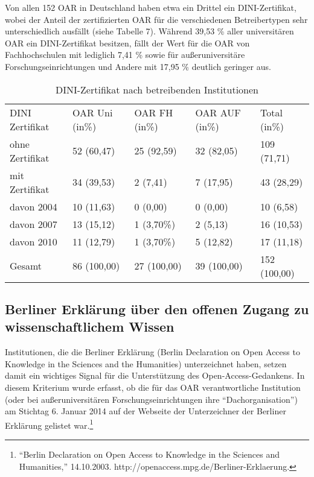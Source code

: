 \documentclass[a4paper,
fontsize=11pt,
oneside,
numbers=noperiodatend,
parskip=half-,
bibliography=totoc,
final
]{scrartcl}
\begin{document}
Von allen 152 OAR in Deutschland haben etwa ein Drittel ein
DINI-Zertifikat, wobei der Anteil der zertifizierten OAR für die
verschiedenen Betreibertypen sehr unterschiedlich ausfällt (siehe
Tabelle 7). Während 39,53 \% aller universitären OAR ein DINI-Zertifikat
besitzen, fällt der Wert für die OAR von Fachhochschulen mit lediglich
7,41 \% sowie für außeruniversitäre Forschungseinrichtungen und Andere
mit 17,95 \% deutlich geringer aus.

\begin{table}[ht]
\centering
\begin{tabular}{lllll}
  \toprule
DINI Zertifikat & OAR Uni (in\%)   & OAR FH (in\%)  & OAR AUF (in\%)  & Total (in\%) \\  
\cmidrule(r){1-1} \cmidrule(r){2-2} \cmidrule(r){3-3} \cmidrule(r){4-4} \cmidrule(r){5-5}
ohne Zertifikat & 52 (60,47) & 25 (92,59) & 32 (82,05) & 109 (71,71)  \\ 
  mit Zertifikat & 34 (39,53) & 2 (7,41) & 7 (17,95) & 43 (28,29) \\ 
  davon 2004 & 10 (11,63) & 0 (0,00) & 0 (0,00) & 10 (6,58) \\ 
  davon 2007 & 13 (15,12) & 1 (3,70\%) & 2 (5,13) & 16 (10,53) \\ 
  davon 2010 & 11 (12,79) & 1 (3,70\%) & 5 (12,82) & 17 (11,18) \\ 
  \cmidrule(r){1-1} \cmidrule(r){2-2} \cmidrule(r){3-3} \cmidrule(r){4-4} \cmidrule(r){5-5}
  Gesamt & 86 (100,00) & 27 (100,00) & 39 (100,00) & 152 (100,00) \\ 
\bottomrule
\end{tabular}
\caption{DINI-Zertifikat nach betreibenden Institutionen}
\end{table}

\subsection*{Berliner Erklärung über den offenen Zugang zu
wissenschaftlichem
Wissen}\label{berliner-erkluxe4rung-uxfcber-den-offenen-zugang-zu-wissenschaftlichem-wissen}

Institutionen, die die Berliner Erklärung (Berlin Declaration on Open
Access to Knowledge in the Sciences and the Humanities) unterzeichnet
haben, setzen damit ein wichtiges Signal für die Unterstützung des
Open-Access-Gedankens. In diesem Kriterium wurde erfasst, ob die für das
OAR verantwortliche Institution (oder bei außeruniversitären
Forschungseinrichtungen ihre \enquote{Dachorganisation}) am Stichtag 6.
Januar 2014 auf der Webseite der Unterzeichner der Berliner Erklärung
gelistet war.\footnote{\enquote{Berlin Declaration on Open Access to
  Knowledge in the Sciences and Humanities,} 14.10.2003.
  http://openaccess.mpg.de/Berliner-Erklaerung.}
\end{document}
